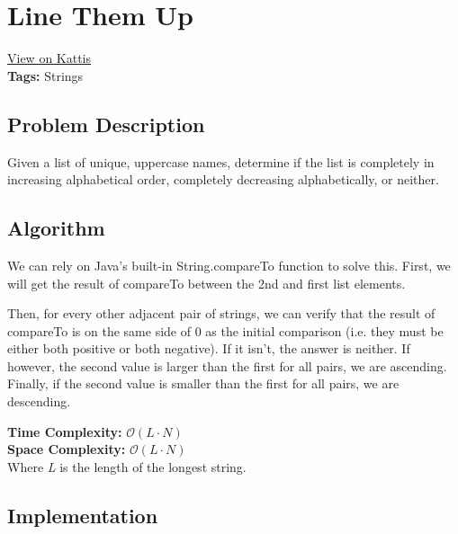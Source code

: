 \section{Line Them Up}
\label{linethemup}
\href{https://open.kattis.com/problems/lineup}{View on Kattis}\\
\textbf{Tags:} Strings\\
\subsection{Problem Description}

Given a list of unique, uppercase names, determine if the list is completely
in increasing alphabetical order, completely decreasing alphabetically, or
neither.
\subsection{Algorithm}

We can rely on Java's built-in String.compareTo function to solve this. First,
we will get the result of compareTo between the 2nd and first list elements.

Then, for every other adjacent pair of strings, we can verify that the result
of compareTo is on the same side of 0 as the initial comparison (i.e. they must
be either both positive or both negative). If it isn't, the answer is neither.
If however, the second value is larger than the first for all pairs, we are
ascending. Finally, if the second value is smaller than the first for all pairs,
we are descending.

\hfill\break
\textbf{Time Complexity:} $\mathcal{O}(L \cdot N)$\\
\textbf{Space Complexity:} $\mathcal{O}(L \cdot N)$\\
Where \textit{L} is the length of the longest string.
\pagebreak
\subsection{Implementation}

\pagebreak
